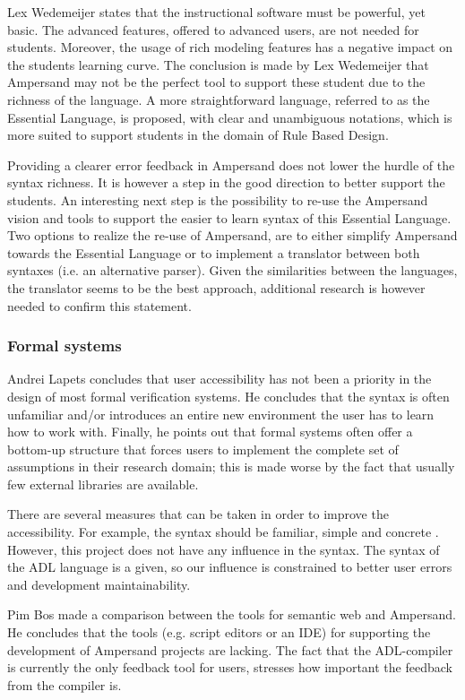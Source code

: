 Lex Wedemeijer  states that the instructional software must be powerful, yet basic.
The advanced features, offered to advanced users, are not needed for students.
Moreover, the usage of rich modeling features has a negative impact on the students learning curve.
The conclusion is made by Lex Wedemeijer that Ampersand may not be the perfect tool to support these student due to the richness of the language.
A more straightforward language, referred to as the Essential Language, is proposed, with clear and unambiguous notations, which is more suited to support students in the domain of Rule Based Design.

Providing a clearer error feedback in Ampersand does not lower the hurdle of the syntax richness.
It is however a step in the good direction to better support the students. 
An interesting next step is the possibility to re-use the Ampersand vision and tools to support the easier to learn syntax of this Essential Language.
Two options to realize the re-use of Ampersand, are to either simplify Ampersand towards the Essential Language or to implement a translator between both syntaxes (i.e. an alternative parser).
Given the similarities between the languages, the translator seems to be the best approach, additional research is however needed to confirm this statement.

\subsubsection{Formal systems}
Andrei Lapets  concludes that user accessibility has not been a priority in the design of most formal verification systems.
He concludes that the syntax is often unfamiliar and/or introduces an entire new environment the user has to learn how to work with.
Finally, he points out that formal systems often offer a bottom-up structure that forces users to implement the complete set of assumptions in their research domain; this is made worse by the fact that usually few external libraries are available.

There are several measures that can be taken in order to improve the accessibility.
For example, the syntax should be familiar, simple and concrete .
However, this project does not have any influence in the syntax.
The syntax of the ADL language is a given, so our influence is constrained to better user errors and development maintainability.

Pim Bos  made a comparison between the tools for semantic web and Ampersand.
He concludes that the tools (e.g. script editors or an IDE) for supporting the development of Ampersand projects are lacking.
The fact that the ADL-compiler is currently the only feedback tool for users, stresses how important the feedback from the compiler is.

